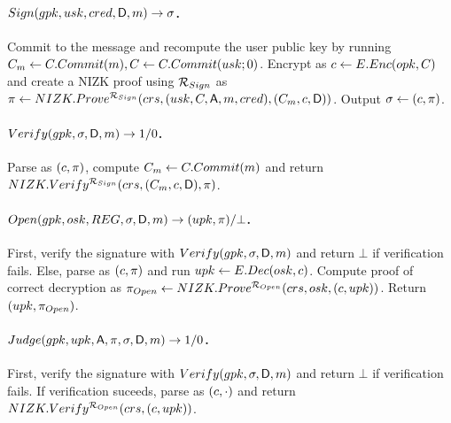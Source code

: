 \paragraph{$Sign(gpk,usk,cred,\mathsf{D},m) \rightarrow \sigma$.} %
Commit to the message and recompute the user public key by running
$C_{m} \gets C.Commit(m), C \gets C.Commit(usk; 0)$.
Encrypt \Ccom as $c \gets E.Enc(opk,C)$ and create a NIZK proof using
$\mathcal{R}_{Sign}$ as $\pi \gets NIZK.Prove^{\mathcal{R}_{Sign}}
(crs,(usk,C,\mathsf{A},m,cred),
(C_{m},c,\mathsf{D}))$. Output $\sigma \gets (c,\pi)$.

\paragraph{$Verify(gpk,\sigma,\mathsf{D},m) \rightarrow 1/0$.} %
Parse \sig as $(c,\pi)$, compute $C_{m} \gets C.Commit(m)$ and
return $NIZK.Verify^{\mathcal{R}_{Sign}}(crs,(C_{m},c,\mathsf{D}),
\pi)$.

\paragraph{$\Open(\gpk,\osk,\trans,\sig,\DAttrs,\msg)
  \rightarrow (\upk,\oproof)/\bot$.} %
First, verify the signature with $Verify(gpk,\sigma,\mathsf{D},m)$ and
return $\bot$ if verification fails. Else, parse \sig as $(c,\pi)$
and run $upk \gets E.Dec(osk,c)$. Compute proof of correct decryption
as $\pi_{Open} \gets NIZK.Prove^{\mathcal{R}_{Open}}(crs,osk,(c,
upk))$. Return $(upk,\pi_{Open})$.

\paragraph{$Judge(gpk,upk,\mathsf{A},\pi,\sigma,\mathsf{D},m)
  \rightarrow 1/0$.} %
First, verify the signature with $Verify(gpk,\sigma,\mathsf{D},m)$ and
return $\bot$ if verification fails. If verification suceeds, parse
\sig as $(c,\cdot)$ and return $NIZK.Verify^{\mathcal{R}_{Open}}(crs,(c,
upk))$.


